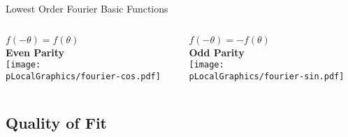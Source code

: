 \begin{frame}{Lowest Order Fourier Basic Functions}
    \centering
    \begin{columns}[c] %
        \begin{column}{0.5\textwidth}
            \centering
            $f(-\theta) = f(\theta)$  \\[0.5em]
            \textbf{Even Parity} \\[0.5em]
            \texttt{[image: \\pLocalGraphics/fourier-cos.pdf]}
        \end{column}

        \begin{column}{0.5\textwidth}
            \centering
            $f(-\theta) = -f(\theta)$  \\[0.5em]
            \textbf{Odd Parity} \\[0.5em]
            \texttt{[image: \\pLocalGraphics/fourier-sin.pdf]}
        \end{column}
    \end{columns}
\end{frame}

	


\subsection{Quality of Fit}

\endinput  %

